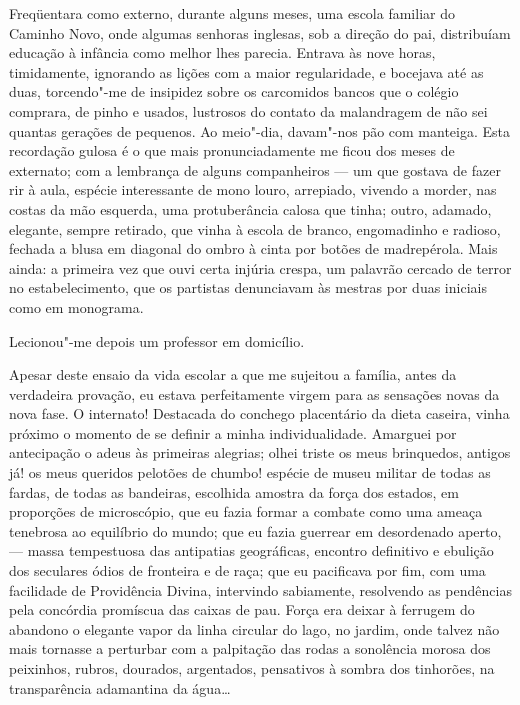 Freqüentara como externo, durante alguns
meses, uma escola familiar do Caminho Novo, onde algumas senhoras
inglesas, sob a direção do pai, distribuíam educação à infância como
melhor lhes parecia. Entrava às nove horas, timidamente, ignorando as
lições com a maior regularidade, e bocejava até as duas, torcendo"-me
de insipidez sobre os carcomidos bancos que o colégio comprara, de
pinho e usados, lustrosos do contato da malandragem de não sei quantas
gerações de pequenos. Ao meio"-dia, davam"-nos pão com manteiga. Esta
recordação gulosa é o que mais pronunciadamente me ficou dos meses de
externato; com a lembrança de alguns companheiros --- um que gostava de
fazer rir à aula, espécie interessante de mono louro, arrepiado,
vivendo a morder, nas costas da mão esquerda, uma protuberância calosa
que tinha; outro, adamado, elegante, sempre retirado, que vinha à
escola de branco, engomadinho e radioso, fechada a blusa em diagonal do
ombro à cinta por botões de madrepérola. Mais ainda: a primeira vez que
ouvi certa injúria crespa, um palavrão cercado de terror no
estabelecimento, que os partistas denunciavam às mestras por duas
iniciais como em monograma. 

Lecionou"-me depois um professor em domicílio. 

Apesar deste ensaio da vida escolar a que me sujeitou a
família, antes da verdadeira provação, eu estava perfeitamente virgem
para as sensações novas da nova fase. O internato! Destacada do
conchego placentário da dieta caseira, vinha próximo o momento de se
definir a minha individualidade. Amarguei por antecipação o adeus às primeiras alegrias;
olhei triste os meus brinquedos, antigos já! os meus queridos pelotões
de chumbo! espécie de museu militar de todas as fardas, de todas as
bandeiras, escolhida amostra da força dos estados, em proporções de
microscópio, que eu fazia formar a combate como uma ameaça tenebrosa ao
equilíbrio do mundo; que eu fazia guerrear em desordenado aperto, --- 
massa tempestuosa das antipatias geográficas, encontro definitivo e
ebulição dos seculares ódios de fronteira e de raça; que eu pacificava
por fim, com uma facilidade de Providência Divina, intervindo
sabiamente, resolvendo as pendências pela concórdia promíscua das
caixas de pau. Força era deixar à ferrugem do abandono o elegante vapor
da linha circular do lago, no jardim, onde talvez não mais tornasse a
perturbar com a palpitação das rodas a sonolência morosa dos peixinhos,
rubros, dourados, argentados, pensativos à sombra dos tinhorões, na
transparência adamantina da água\ldots{} 

